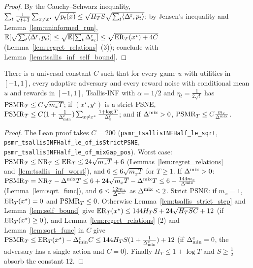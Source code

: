 \begin{proof}
  \leanok
  By the Cauchy--Schwarz inequality, $\sum_t\frac{1}{\sqrt{t + 1}}\sum_{x \ne x^\star}
  \sqrt{p_t(x)} \le \sqrt{H_T S}\sqrt{\sum_t\langle\Delta^{\mathrm{r}}, p_t\rangle}$; by Jensen's inequality and
  Lemma~\ref{lem:uninformed_run}, $\mathbb{E}[\sqrt{\sum_t\langle\Delta^{\mathrm{r}}, p_t\rangle}] \le
  \sqrt{\mathbb{E}[\sum_t\Delta^{\mathrm{r}}_{x_t}]} \le \sqrt{\mathrm{ER}_T(x^\star) + 4C}$
  (Lemma~\ref{lem:regret_relations}~(3)); conclude with
  Lemma~\ref{lem:tsallis_inf_self_bound}.
\end{proof}

\begin{theorem}[Theorem 1]
  \label{thm:tsallis}
  \leanok
  There is a universal constant $C$ such that for every game $u$ with utilities in $[-1, 1]$, every
  adaptive adversary and every reward noise with conditional mean $u$ and rewards in $[-1, 1]$,
  Tsallis-INF with $\alpha = 1/2$ and $\eta_t = \frac{1}{2\sqrt t}$ has
  $\mathrm{PSMR}_T \le C \sqrt{m_x T}$; if $(x^\star, y^\star)$ is a strict PSNE,
  $\mathrm{PSMR}_T \le C (1 + \frac{1}{\Delta^{\mathrm{c}}_{\min}}) \sum_{x \ne x^\star} \frac{1 + \log T}{\Delta^{\mathrm{r}}_x}$; and if
  $\Delta^{\mathrm{mix}} > 0$, $\mathrm{PSMR}_T \le C \frac{m_x}{\Delta^{\mathrm{mix}}}$.
\end{theorem}

\begin{proof}
  \leanok
  The Lean proof takes $C = 200$ (\texttt{psmr\_tsallisINFHalf\_le\_sqrt},
  \texttt{psmr\_tsallisINFHalf\_le\_of\_isStrictPSNE},
  \texttt{psmr\_tsallisINFHalf\_le\_of\_mixGap\_pos}).
  Worst case: $\mathrm{PSMR}_T \le \mathrm{NR}_T \le \mathrm{ER}_T \le 24\sqrt{m_x T} + 6$
  (Lemmas~\ref{lem:regret_relations} and~\ref{lem:tsallis_inf_worst}), and $6 \le 6\sqrt{m_x T}$ for
  $T \ge 1$. If $\Delta^{\mathrm{mix}} > 0$: $\mathrm{PSMR}_T = \mathrm{NR}_T - \Delta^{\mathrm{mix}} T \le 6 + 24\sqrt{m_x T} - \Delta^{\mathrm{mix}} T \le 6 +
  \frac{144 m_x}{\Delta^{\mathrm{mix}}}$ (Lemma~\ref{lem:sqrt_func}), and $6 \le \frac{12 m_x}{\Delta^{\mathrm{mix}}}$ as $\Delta^{\mathrm{mix}} \le
  2$. Strict PSNE: if $m_x = 1$, $\mathrm{ER}_T(x^\star) = 0$ and $\mathrm{PSMR}_T \le 0$. Otherwise
  Lemma~\ref{lem:tsallis_strict_step} and Lemma~\ref{lem:self_bound} give $\mathrm{ER}_T(x^\star) \le 144
  H_T S + 24\sqrt{H_T S C} + 12$ (if $\mathrm{ER}_T(x^\star) \ge 0$), and Lemma~\ref{lem:regret_relations}
  (2) and Lemma~\ref{lem:sqrt_func} in $C$ give $\mathrm{PSMR}_T \le \mathrm{ER}_T(x^\star) - \Delta^{\mathrm{c}}_{\min} C \le 144 H_T S
  (1 + \frac{1}{\Delta^{\mathrm{c}}_{\min}}) + 12$ (if $\Delta^{\mathrm{c}}_{\min} = 0$, the adversary has a single action and $C = 0$).
  Finally $H_T \le 1 + \log T$ and $S \ge \frac12$ absorb the constant $12$.
\end{proof}

